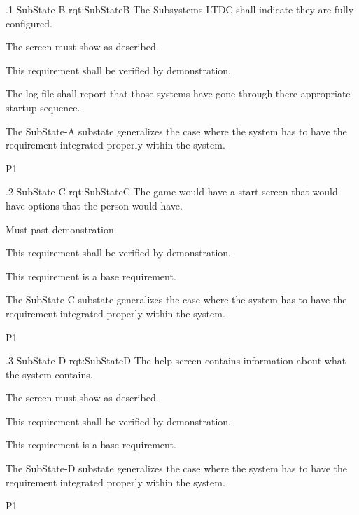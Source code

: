 \ONERQMTV
{\RqtNumberBase.1}
{SubState B}
{rqt:SubStateB}
{The Subsystems LTDC shall indicate they are fully configured.}
{
	\item [Phase 1] The screen must show as described.
}
{This requirement shall be verified by demonstration.}
{
	\item [1] The log file shall report that those systems have gone through there appropriate startup sequence.
}
{
	\item The SubState-A substate generalizes the case where the system has to have the requirement integrated properly within the system.
}
{P1}

\ONERQMTV
{\RqtNumberBase.2}
{SubState C}
{rqt:SubStateC}
{The game would have a start screen that would have options that the person would have.}
{
	\item [Phase 1] Must past demonstration
}
{This requirement shall be verified by demonstration.}
{
	\item [N/A] This requirement is a base requirement.
}
{
	\item The SubState-C substate generalizes the case where the system has to have the requirement integrated properly within the system.
}
{P1}


\ONERQMTV
{\RqtNumberBase.3}
{SubState D}
{rqt:SubStateD}
{The help screen contains information about what the system contains.}
{
	\item [Phase 1] The screen must show as described.
}
{This requirement shall be verified by demonstration.}
{
	\item [N/A] This requirement is a base requirement.
}
{
	\item The SubState-D substate generalizes the case where the system has to have the requirement integrated properly within the system.
}
{P1}

